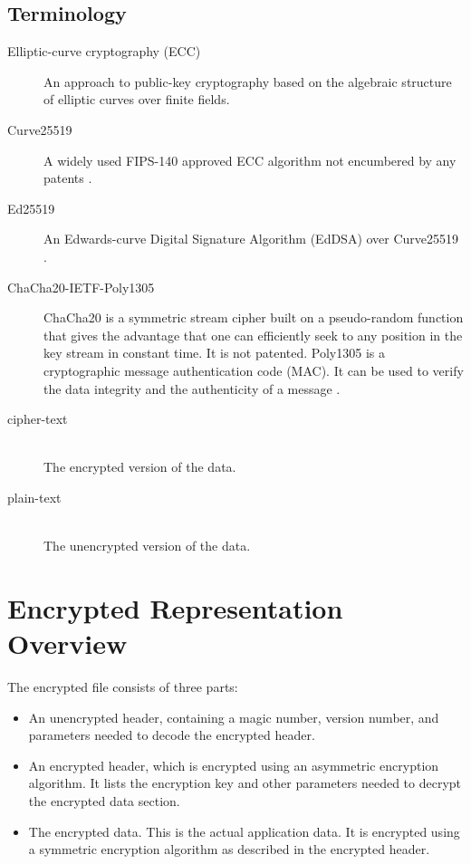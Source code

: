 \documentclass[10pt]{article}
\begin{document}
\subsection{Terminology}
\begin{description}
\item[Elliptic-curve cryptography (ECC)]
An approach to public-key cryptography based on the algebraic structure of elliptic curves over finite fields.
\item[Curve25519]
A widely used FIPS-140 approved ECC algorithm not encumbered by any patents \cite{RFC7748}.
\item[Ed25519]
An Edwards-curve Digital Signature Algorithm (EdDSA) over Curve25519 \cite{RFC8032}.
\item[ChaCha20-IETF-Poly1305]
ChaCha20 is a symmetric stream cipher built on a pseudo-random function that gives the advantage that one can
efficiently seek to any position in the key stream in constant time.
It is not patented.
Poly1305 is a cryptographic message authentication code (MAC).
It can be used to verify the data integrity and the authenticity of a message \cite{RFC8439}.

\item[cipher-text]~\\
The encrypted version of the data.

\item[plain-text]~\\
The unencrypted version of the data.

\end{description}

\section{Encrypted Representation Overview}
The encrypted file consists of three parts:

\begin{itemize}
\item An unencrypted header, containing a magic number, version number, and parameters needed to decode the encrypted
header.

\item An encrypted header, which is encrypted using an asymmetric encryption algorithm.
It lists the encryption key and other parameters needed to decrypt the encrypted data section.

\item The encrypted data.
This is the actual application data.
It is encrypted using a symmetric encryption algorithm as described in the encrypted header.
\end{itemize}
\end{document}

